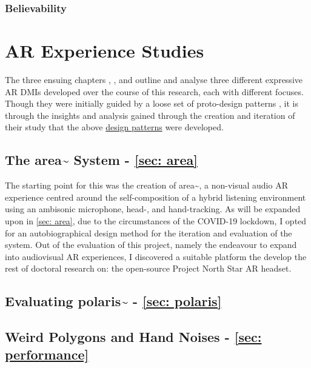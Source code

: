 \subsubsection{Believability}



\section{AR Experience Studies}
The three ensuing chapters \textit{}, \textit{}, and \textit{} outline and analyse three different expressive AR DMIs developed over the course of this research, each with different focuses. Though they were initially guided by a loose set of proto-design patterns \citep{bilbow2021b}, it is through the insights and analysis gained through the creation and iteration of their study that the above \hyperref[sec: method-patterns]{design patterns} were developed.

\subsection{The area\textasciitilde{} System - \autoref{sec: area}}
The starting point for this was the creation of area\textasciitilde{}, a non-visual audio AR experience centred around the self-composition of a hybrid listening environment using an ambisonic microphone, head-, and hand-tracking. As will be expanded upon in \autoref{sec: area}, due to the circumstances of the COVID-19 lockdown, I opted for an autobiographical design method for the iteration and evaluation of the system. Out of the evaluation of this project, namely the endeavour to expand into audiovisual AR experiences, I discovered a suitable platform the develop the rest of doctoral research on: the open-source Project North Star AR headset.

\subsection{Evaluating polaris\textasciitilde{} - \autoref{sec: polaris}}


\subsection{Weird Polygons and Hand Noises - \autoref{sec: performance}}
